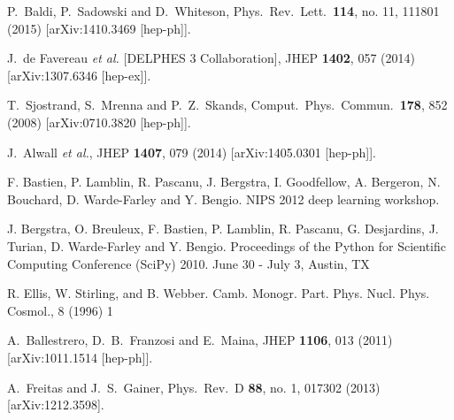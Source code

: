   P.~Baldi, P.~Sadowski and D.~Whiteson,
  Phys.\ Rev.\ Lett.\  {\bf 114}, no. 11, 111801 (2015)
  [arXiv:1410.3469 [hep-ph]].

  J.~de Favereau {\it et al.} [DELPHES 3 Collaboration],
  JHEP {\bf 1402}, 057 (2014)
  [arXiv:1307.6346 [hep-ex]].

  T.~Sjostrand, S.~Mrenna and P.~Z.~Skands,
  Comput.\ Phys.\ Commun.\  {\bf 178}, 852 (2008)
  [arXiv:0710.3820 [hep-ph]].

  J.~Alwall {\it et al.},
  JHEP {\bf 1407}, 079 (2014)
  [arXiv:1405.0301 [hep-ph]].

F. Bastien, P. Lamblin, R. Pascanu, J. Bergstra, I. Goodfellow, A. Bergeron, N. Bouchard, D. Warde-Farley and Y. Bengio. NIPS 2012 deep learning workshop.

J. Bergstra, O. Breuleux, F. Bastien, P. Lamblin, R. Pascanu, G. Desjardins, J. Turian, D. Warde-Farley and Y. Bengio.  Proceedings of the Python for Scientific Computing Conference (SciPy) 2010. June 30 - July 3, Austin, TX


  R. Ellis, W. Stirling, and B. Webber.%
   Camb. Monogr. Part. Phys. Nucl. Phys. Cosmol., 8 (1996) 1

  A.~Ballestrero, D.~B.~Franzosi and E.~Maina,
  JHEP {\bf 1106}, 013 (2011)
  [arXiv:1011.1514 [hep-ph]].

  A.~Freitas and J.~S.~Gainer,
  Phys.\ Rev.\ D {\bf 88}, no. 1, 017302 (2013)
  [arXiv:1212.3598].

